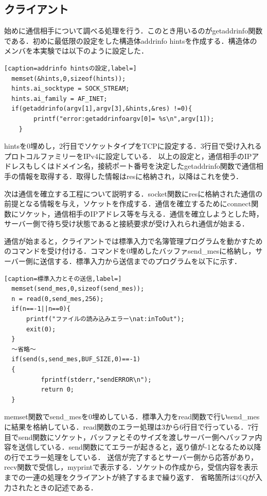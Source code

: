 \documentclass[11pt,a4j,titlepage]{jsarticle}
\begin{document}
\subsection{クライアント}
始めに通信相手について調べる処理を行う．このとき用いるのがgetaddrinfo関数である．初めに最低限の設定をした構造体addrinfo hintsを作成する．構造体のメンバを本実験では以下のように設定した．
\begin{lstlisting}[caption=addrinfo hintsの設定,label=]
  memset(&hints,0,sizeof(hints));
  hints.ai_socktype = SOCK_STREAM;
  hints.ai_family = AF_INET;
  if(getaddrinfo(argv[1],argv[3],&hints,&res) !=0){
        printf("error:getaddrinfoargv[0]= %s\n",argv[1]);
    }
\end{lstlisting}
hintsを0埋めし，2行目でソケットタイプをTCPに設定する．3行目で受け入れるプロトコルファミリーをIPv4に設定している．
以上の設定と，通信相手のIPアドレスもしくはドメイン名，接続ポート番号を決定したgetaddrinfo関数で通信相手の情報を取得する．取得した情報はresに格納され，以降はこれを使う．

次は通信を確立する工程について説明する．socket関数にresに格納された通信の前提となる情報を与え，ソケットを作成する．通信を確立するためにconnect関数にソケット，通信相手のIPアドレス等を与える．通信を確立しようとした時，サーバー側で待ち受け状態であると接続要求が受け入れられ通信が始まる．

通信が始まると，クライアントでは標準入力で名簿管理プログラムを動かすためのコマンドを受け付ける．コマンドを0埋めしたバッファsend\_mesに格納し，サーバー側に送信する．標準入力から送信までのプログラムを以下に示す．
\begin{lstlisting}[caption=標準入力とその送信,label=]
  memset(send_mes,0,sizeof(send_mes));
  n = read(0,send_mes,256);
  if(n==-1||n==0){
      printf("ファイルの読み込みエラー\nat:inToOut");
      exit(0);
  }
  ～省略～
  if(send(s,send_mes,BUF_SIZE,0)==-1)
  {
          fprintf(stderr,"sendERROR\n");
          return 0;
  }
\end{lstlisting}
memset関数でsend\_mesを0埋めしている．標準入力をread関数で行いsend\_mesに結果を格納している．read関数のエラー処理は3から6行目で行っている．7行目でsend関数にソケット，バッファとそのサイズを渡しサーバー側へバッファ内容を送信している．send関数にてエラーが起きると，返り値が-1となるため以降の行でエラー処理をしている．
送信が完了するとサーバー側から応答があり，recv関数で受信し，myprintで表示する．ソケットの作成から，受信内容を表示までの一連の処理をクライアントが終了するまで繰り返す．
省略箇所は\%Qが入力されたときの記述である．
\end{document}

